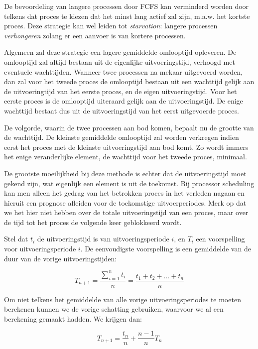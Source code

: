 De bevoordeling van langere processen door FCFS kan verminderd
worden door telkens dat proces te kiezen dat het minst lang actief zal
zijn, m.a.w. het kortste proces. Deze strategie kan wel leiden tot
\emph{starvation}: langere processen
\emph{verhongeren} zolang er een aanvoer is van
kortere processen.

Algemeen zal deze strategie een lagere gemiddelde omlooptijd
opleveren. De omlooptijd zal altijd bestaan uit de eigenlijke
uitvoeringstijd, verhoogd met eventuele wachttijden. Wanneer twee
processen na mekaar uitgevoerd worden, dan zal voor het tweede proces
de omlooptijd bestaan uit een wachttijd gelijk aan de uitvoeringtijd
van het eerste proces, en de eigen uitvoeringstijd. Voor het eerste
proces is de omlooptijd uiteraard gelijk aan de uitvoeringstijd. De
enige wachttijd bestaat dus uit de uitvoeringstijd van het eerst
uitgevoerde proces.

De volgorde, waarin de twee processen aan bod komen, bepaalt nu
de grootte van de wachttijd. De kleinste gemiddelde omlooptijd zal
worden verkregen indien eerst het proces met de kleinste
uitvoeringstijd aan bod komt. Zo wordt immers het enige veranderlijke
element, de wachttijd voor het tweede proces, minimaal.

De grootste moeilijkheid bij deze methode is echter dat de
uitvoeringstijd moet gekend zijn, wat eigenlijk een element is uit de
toekomst. Bij processor scheduling kan men alleen het gedrag van het
betrokken proces in het verleden nagaan en hieruit een prognose
afleiden voor de toekomstige uitvoerperiodes. Merk op dat we het hier
niet hebben over de totale uitvoeringstijd van een proces, maar over
de tijd tot het proces de volgende keer geblokkeerd wordt.

Stel dat $t_i$ de uitvoeringstijd is van uitvoeringsperiode $i$, en
$T_i$ een voorspelling voor uitvoeringsperiode $i$. De eenvoudigste
voorspelling is een gemiddelde van de duur van de vorige
uitvoeringstijden:

\begin{displaymath}
T_{n+1} = \frac{\sum_{i=1}^{n}t_i}{n} = \frac{t_1 + t_2 + \ldots + t_n}{n}
\end{displaymath}

Om niet telkens het gemiddelde van alle vorige
uitvoeringsperiodes te moeten berekenen kunnen we de vorige schatting
gebruiken, waarvoor we al een berekening gemaakt hadden. We krijgen
dan:

\begin{displaymath}
T_{n+1} = \frac{t_n}{n} + \frac{n-1}{n}T_n
\end{displaymath}

